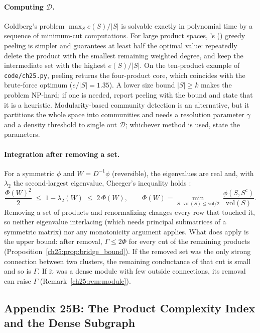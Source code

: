 \documentclass[../structural_economics_book.tex]{subfiles}
\begin{document}
\paragraph{Computing $\mathcal{D}$.} Goldberg's problem $\max_S e(S)/|S|$ is solvable exactly in polynomial time by a sequence of minimum-cut computations. For large product spaces, \citeauthor{charikar2000greedy}'s (\citeyear{charikar2000greedy}) greedy peeling is simpler and guarantees at least half the optimal value: repeatedly delete the product with the smallest remaining weighted degree, and keep the intermediate set with the highest $e(S)/|S|$. On the ten-product example of \texttt{code/ch25.py}, peeling returns the four-product core, which coincides with the brute-force optimum ($e/|S| = 1.35$). A lower size bound $|S| \ge k$ makes the problem NP-hard; if one is needed, report peeling with the bound and state that it is a heuristic. Modularity-based community detection is an alternative, but it partitions the whole space into communities and needs a resolution parameter $\gamma$ and a density threshold to single out $\mathcal{D}$; whichever method is used, state the parameters.

\paragraph{Integration after removing a set.} For a symmetric $\phi$ and $W = D^{-1}\phi$ (reversible), the eigenvalues are real and, with $\lambda_2$ the second-largest eigenvalue, Cheeger's inequality holds \citep{lawler1988bounds,sinclair1989approximate}:
\[
\frac{\Phi(W)^2}{2} \;\le\; 1 - \lambda_2(W) \;\le\; 2\,\Phi(W), \qquad \Phi(W) = \min_{S:\ \mathrm{vol}(S) \le \mathrm{vol}/2}\ \frac{\phi(S, S^c)}{\mathrm{vol}(S)}.
\]
Removing a set of products and renormalizing changes every row that touched it, so neither eigenvalue interlacing (which needs principal submatrices of a symmetric matrix) nor any monotonicity argument applies. What does apply is the upper bound: after removal, $\Gamma \le 2\Phi$ for every cut of the remaining products (Proposition~\ref{ch25:prop:bridge_bound}). If the removed set was the only strong connection between two clusters, the remaining conductance of that cut is small and so is $\Gamma$. If it was a dense module with few outside connections, its removal can raise $\Gamma$ (Remark~\ref{ch25:rem:module}).


\subsection*{Appendix 25B: The Product Complexity Index and the Dense Subgraph}
\label{ch25:app:PCI}
\end{document}
